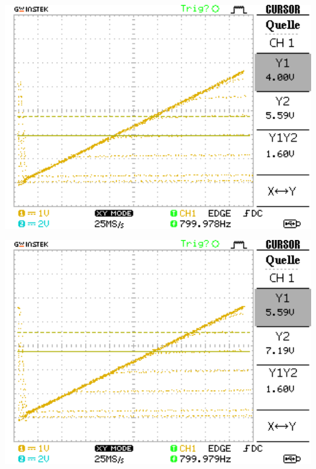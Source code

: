 \documentclass[10pt]{article}
\newenvironment{Figure}
  {\par\medskip\noindent\minipage{\linewidth}}
  {\endminipage\par\medskip}
\begin{document}
\begin{multicols}{2}
\begin{Figure}
		\label{fig:1.3}
	\end{Figure}
	\begin{Figure}
		\centering\includegraphics[width=1\textwidth]{data/Kennlinie3_npn.png}
		\label{fig:1.4}
	\end{Figure}
	\begin{Figure}
		\centering\includegraphics[width=1\textwidth]{data/Kennlinie4_npn.png}
		\label{fig:1.5}
	\end{Figure}
	\begin{Figure}

\end{Figure}
\end{multicols}
\end{document}
